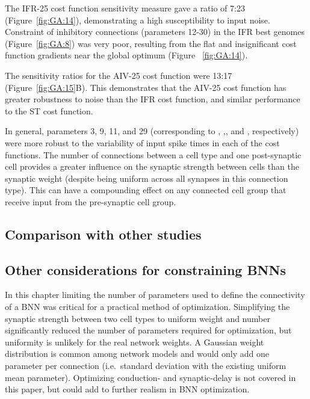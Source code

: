 The IFR-25 cost function sensitivity measure gave a ratio of 7:23
(Figure~\ref{fig:GA:14}), demonstrating a high susceptibility to input
noise. Constraint of inhibitory connections (parameters 12-30) in the IFR
best genomes (Figure~\ref{fig:GA:8}) was very poor, resulting from the flat
and insignificant cost function gradients near the global optimum (Figure
~\ref{fig:GA:14}).

\smallskip{}

The sensitivity ratios for the AIV-25 cost function were 13:17
(Figure~\ref{fig:GA:15}B).  This demonstrates that the AIV-25 cost function
has greater robustness to noise than the IFR cost function, and similar
performance to the ST cost function.

\smallskip{}

In general, parameters 3, 9, 11, and 29 (corresponding to \nHSRTS,
\nHSRTV,\nLSRGLG, and \nGLGDS, respectively) were more robust to the
variability of input spike times in each of the cost functions.  The number
of connections between a cell type and one post-synaptic cell provides a
greater influence on the synaptic strength between cells than the synaptic
weight (despite being uniform across all synapses in this connection
type). This can have a compounding effect on any connected cell group that
receive input from the pre-synaptic cell group.


\subsection{Comparison with other studies}\label{sec:GA:comp-with-other}



\smallskip{}


\subsection{Other considerations for constraining BNNs}\label{sec:GA:other-considerations}

In this chapter limiting the number of parameters used to define the
connectivity of a BNN was critical for a practical method of
optimization. Simplifying the synaptic strength between two cell types to
uniform weight and number significantly reduced the number of parameters
required for optimization, but uniformity is unlikely for the real network
weights.  A Gaussian weight distribution is common among network models and
would only add one parameter per connection (i.e.\ standard deviation with
the existing uniform mean parameter).  Optimizing conduction- and
synaptic-delay is not covered in this paper, but could add to further
realism in BNN optimization.

